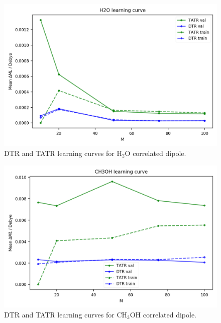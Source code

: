 \begin{figure}
    \centering
    \includegraphics[scale=1.0]{p2/figures/si/H2O_learn_d.png}
    \caption{DTR and TATR learning curves for H$_2$O correlated dipole.}
\end{figure}

\begin{figure}
    \centering
    \includegraphics[scale=1.0]{p2/figures/si/CH3OH_learn_d.png}
    \caption{DTR and TATR learning curves for CH$_3$OH correlated dipole.}
\end{figure}

